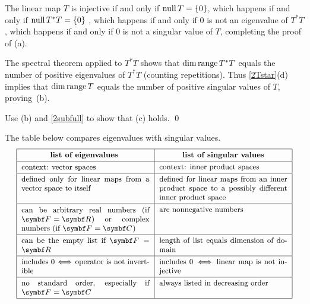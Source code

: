 \proof
The linear map $T$ is injective if and only if $\operatorname{null} T = \{0\}$, which happens if and only if $\operatorname{null} T^*T = \{0\}$ , which happens if and only if $0$ is not an eigenvalue of $T^*T$, which happens if and only if $0$ is not a singular value of $T$, completing the proof of (a).

The spectral theorem applied to $T^* T$ shows that $\dim \operatorname{range} T^*T$ equals the number of positive eigenvalues of $T^*T$ (counting repetitions). Thus \ref{2Tstar}(d) implies that $\dim \operatorname{range} T$ equals the number of positive singular values of $T$, proving~(b).

Use (b) and \ref{2subfull} to show that (c) holds.
\qed

The table below compares eigenvalues with singular values.
\[
\begin{tabular}{|p{2.13in}|p{2.13in}|}
\hline
\vspace{-5bp}\hfil\small\textbf{list of eigenvalues} \vspace{1bp}& \vspace{-5bp}\hfil\small\textbf{list of singular values}\\ \hline
\vspace{-4bp}\small context: vector spaces & \vspace{-5bp}\small context: inner product spaces \vspace{1bp}\\ \hline
\vspace{-5bp}\small defined only for linear maps from a vector space to itself
& \vspace{-5bp}\small defined for linear maps from an inner product space to a possibly different inner product space \vspace{1bp}\\ \hline
\vspace{-5bp}\small can be arbitrary real numbers (if \mbox{$\F{} = \R{}$}) or complex numbers (if $\F{} = \C{}$) \vspace{1bp}&
\vspace{-5bp}\small are nonnegative numbers\\ \hline
\vspace{-5bp}\small can be the empty list if $\F{} = \R{}$
& \vspace{-5bp}\small length of list equals dimension of domain\vspace{1bp}\\ \hline
\vspace{-5bp}\small includes $0 \! \iff \!$ operator is not invertible
& \vspace{-5bp}\small includes $0 \! \iff\!$ linear map is not injective\vspace{1bp}\\ \hline
\vspace{-5bp}\small no standard order, especially if $\F{} = \C{}$ \vspace{1bp} & \vspace{-5bp}\small always listed in decreasing order\\ \hline
\end{tabular}
\]

